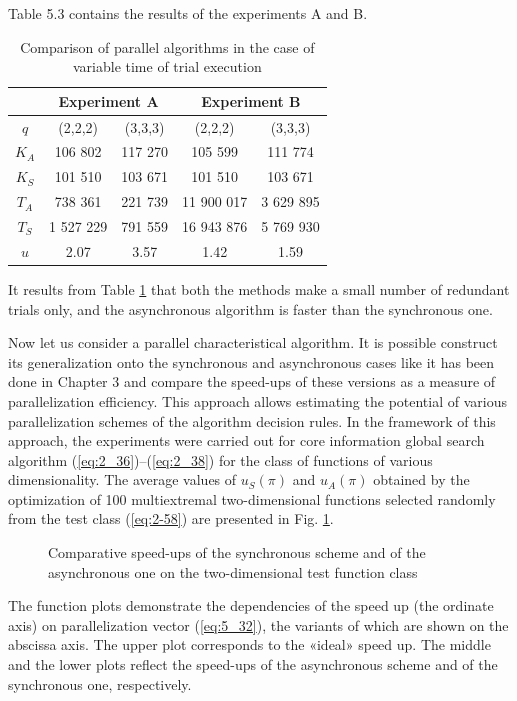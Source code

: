Table 5.3 contains the results of the experiments A and B.
\begin{table}
\caption{Comparison of parallel algorithms in the case of variable time of trial execution}
\label {tab:5_3}
\begin{center}
\begin{tabular}{|c|c|c|c|c|}
\hline
 & \multicolumn{2}{c|}{Experiment A} & \multicolumn{2}{c|}{Experiment B} \\
\hline
$q$ & (2,2,2) & (3,3,3) & (2,2,2) & (3,3,3)    \\
\hline
$K_A$ & 106 802 & 117 270 & 105 599 & 111 774 \\
\hline
$K_S$ & 101 510 & 103 671 & 101 510 & 103 671 \\
\hline
$T_A$ & 738 361 & 221 739 & 11 900 017 & 3 629 895 \\
\hline
$T_S$ & 1 527 229 & 791 559 & 16 943 876 & 5 769 930 \\
\hline
$u$   & 2.07  &  3.57  &  1.42  &  1.59  \\
\hline
\end{tabular}
\end{center}
\end{table}

It results from Table \ref{tab:5_3} that both the methods make a small number of redundant trials only, and the asynchronous algorithm is faster than the synchronous one.

Now let us consider a parallel characteristical algorithm. It is possible construct its generalization onto the synchronous and asynchronous cases like it has been done in Chapter 3 and compare the speed-ups of these versions as a measure of parallelization efficiency. This approach allows estimating the potential of various parallelization schemes of the algorithm decision rules. In the framework of this approach, the experiments were carried out for core information global search algorithm (\ref{eq:2_36})--(\ref{eq:2_38}) for the  class of functions of various dimensionality. The average values of $u_S(\pi)$ and $u_A(\pi)$ obtained by the optimization of 100 multiextremal two-dimensional functions selected randomly from the test class (\ref{eq:2-58}) are presented in Fig. \ref{fig:5_7}. 
\begin{figure}[t]
\centering
\caption{Comparative speed-ups of the synchronous scheme and of the asynchronous one on the two-dimensional test function class}
\label{fig:5_7}    
\end{figure}
The function plots demonstrate the dependencies of the speed up (the ordinate axis) on parallelization vector (\ref{eq:5_32}), the variants of which are shown on the abscissa axis. The upper plot corresponds to the «ideal» speed up. The middle and the lower plots reflect the speed-ups of the asynchronous scheme and of the synchronous one, respectively. 


